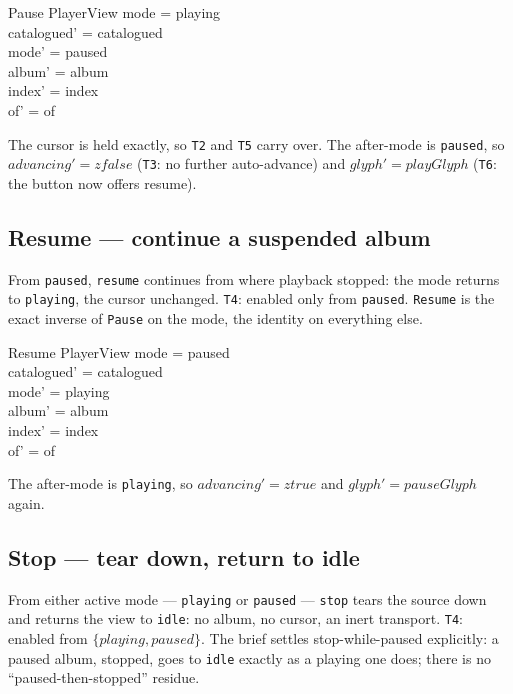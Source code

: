 \documentclass[a4paper,10pt,fleqn]{article}
\begin{document}
\begin{schema}{Pause}
  \Delta PlayerView
  \where
  mode = playing \\
  catalogued' = catalogued \\
  mode' = paused \\
  album' = album \\
  index' = index \\
  of' = of
\end{schema}

The cursor is held exactly, so \texttt{T2} and \texttt{T5} carry over. The
after-mode is \texttt{paused}, so $advancing' = zfalse$ (\texttt{T3}: no further
auto-advance) and $glyph' = playGlyph$ (\texttt{T6}: the button now offers
resume).

\subsection{Resume --- continue a suspended album}
\label{sec:resume}

From \texttt{paused}, \texttt{resume} continues from where playback stopped: the
mode returns to \texttt{playing}, the cursor unchanged. \texttt{T4}: enabled only
from \texttt{paused}. \texttt{Resume} is the exact inverse of \texttt{Pause} on
the mode, the identity on everything else.

\begin{schema}{Resume}
  \Delta PlayerView
  \where
  mode = paused \\
  catalogued' = catalogued \\
  mode' = playing \\
  album' = album \\
  index' = index \\
  of' = of
\end{schema}

The after-mode is \texttt{playing}, so $advancing' = ztrue$ and $glyph' =
pauseGlyph$ again.

\subsection{Stop --- tear down, return to idle}
\label{sec:stop}

From either active mode --- \texttt{playing} or \texttt{paused} ---
\texttt{stop} tears the source down and returns the view to \texttt{idle}: no
album, no cursor, an inert transport. \texttt{T4}: enabled from
$\{ playing, paused \}$. The brief settles stop-while-paused explicitly: a
paused album, stopped, goes to \texttt{idle} exactly as a playing one does; there
is no ``paused-then-stopped'' residue.
\end{document}
